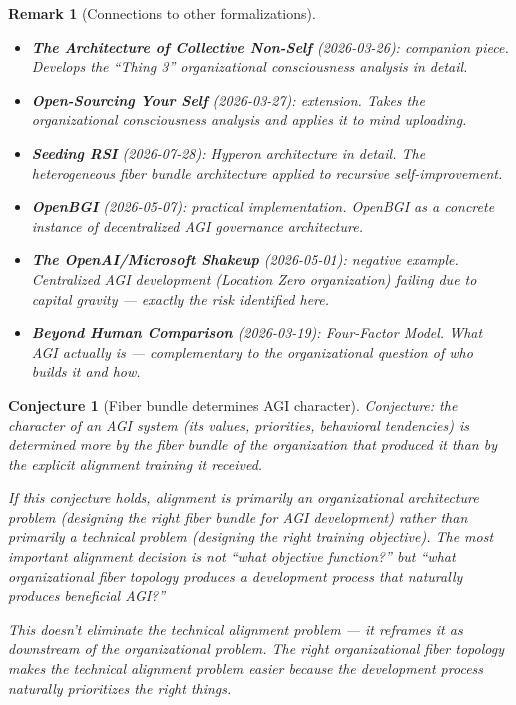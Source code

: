 \documentclass[11pt,a4paper]{article}
\newtheorem{remark}[definition]{Remark}
\newtheorem{conjecture}[definition]{Conjecture}
\begin{document}
\begin{remark}[Connections to other formalizations]
\begin{itemize}
\item \textbf{The Architecture of Collective Non-Self} (2026-03-26):
  companion piece. Develops the ``Thing 3'' organizational consciousness
  analysis in detail.
\item \textbf{Open-Sourcing Your Self} (2026-03-27): extension. Takes
  the organizational consciousness analysis and applies it to mind
  uploading.
\item \textbf{Seeding RSI} (2026-07-28): Hyperon architecture in detail.
  The heterogeneous fiber bundle architecture applied to recursive
  self-improvement.
\item \textbf{OpenBGI} (2026-05-07): practical implementation. OpenBGI
  as a concrete instance of decentralized AGI governance architecture.
\item \textbf{The OpenAI/Microsoft Shakeup} (2026-05-01): negative
  example. Centralized AGI development (Location Zero organization)
  failing due to capital gravity --- exactly the risk identified here.
\item \textbf{Beyond Human Comparison} (2026-03-19): Four-Factor Model.
  What AGI actually is --- complementary to the organizational question
  of who builds it and how.
\end{itemize}
\end{remark}

\begin{conjecture}[Fiber bundle determines AGI character]
Conjecture: the character of an AGI system (its values, priorities,
behavioral tendencies) is determined more by the fiber bundle of the
organization that produced it than by the explicit alignment training
it received.

If this conjecture holds, alignment is primarily an organizational
architecture problem (designing the right fiber bundle for AGI
development) rather than primarily a technical problem (designing the
right training objective). The most important alignment decision is
not ``what objective function?'' but ``what organizational fiber
topology produces a development process that naturally produces
beneficial AGI?''

This doesn't eliminate the technical alignment problem --- it
reframes it as downstream of the organizational problem. The right
organizational fiber topology makes the technical alignment problem
easier because the development process naturally prioritizes the
right things.
\end{conjecture}
\end{document}
